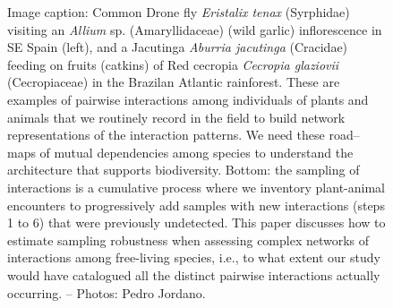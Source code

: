 \documentclass[a4paper,12pt]{article}
\begin{document}
\begin{figure}
  \caption{Image caption: Common Drone fly \textit{Eristalix tenax} (Syrphidae) visiting an \textit{Allium} sp. (Amaryllidaceae) (wild garlic) inflorescence in SE Spain (left), and a Jacutinga \textit{Aburria jacutinga} (Cracidae) feeding on fruits (catkins) of Red cecropia \textit{Cecropia glaziovii} (Cecropiaceae) in the Brazilan Atlantic rainforest. These are examples of pairwise interactions among individuals of plants and animals that we routinely record in the field to build network representations of the interaction patterns. We need these road--maps of mutual dependencies among species to understand the architecture that supports biodiversity. Bottom: the sampling of interactions is a cumulative process where we inventory plant-animal encounters to progressively add samples with new interactions (steps 1 to 6) that were previously undetected. This paper discusses how to estimate sampling robustness when assessing complex networks of interactions among free-living species, i.e., to what extent our study would have catalogued all the distinct pairwise interactions actually occurring. – Photos: Pedro Jordano.}
  \label{Fig_laysumm}
\end{figure}
\end{document}
